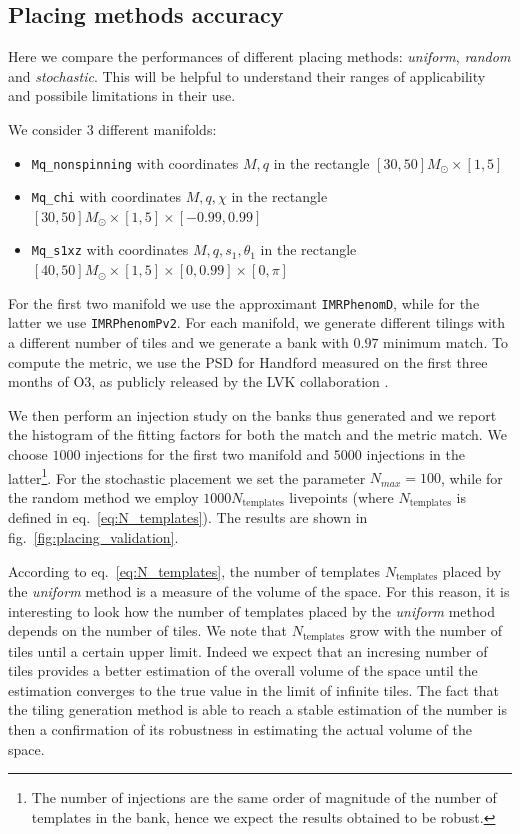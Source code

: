 \documentclass[twocolumn,showpacs,preprintnumbers,nofootinbib,prd,
superscriptaddress,10pt]{revtex4-2}
\begin{document}
\subsection{Placing methods accuracy} \label{sec:placing_accuracy}

Here we compare the performances of different placing methods: \textit{uniform}, \textit{random} and \textit{stochastic}.
This will be helpful to understand their ranges of applicability and possibile limitations in their use.

We consider 3 different manifolds:
\begin{itemize}
	\item \texttt{Mq\_nonspinning} with coordinates $M, q$ in the rectangle $[30, 50] M_\odot \times [1,5]$
	\item \texttt{Mq\_chi} with coordinates $M, q, \chi $ in the rectangle $[30, 50] M_\odot \times [1,5] \times [-0.99, 0.99]$
	\item \texttt{Mq\_s1xz} with coordinates $M, q, s_{1}, \theta_1$ in the rectangle $[40, 50] M_\odot \times [1,5] \times [0, 0.99] \times [0,\pi]$
\end{itemize}
For the first two manifold we use the approximant \texttt{IMRPhenomD}, while for the latter we use \texttt{IMRPhenomPv2}.
For each manifold, we generate different tilings with a different number of tiles and we generate a bank with $0.97$ minimum match.
To compute the metric, we use the PSD for Handford measured on the first three months of O3, as publicly released by the LVK collaboration \cite{https://dcc.ligo.org/LIGO-T2000012/public}.

We then perform an injection study on the banks thus generated and we report the histogram of the fitting factors for both the match and the metric match. We choose $1000$ injections for the first two manifold and $5000$ injections in the latter\footnote{
The number of injections are the same order of magnitude of the number of templates in the bank, hence we expect the results obtained to be robust.}.
For the stochastic placement we set the parameter $N_{max} = 100$, while for the random method we employ $1000 N_{\text{templates}}$ livepoints (where $N_{\text{templates}}$ is defined in eq.~\eqref{eq:N_templates}).
The results are shown in fig.~\ref{fig:placing_validation}.

According to eq.~\eqref{eq:N_templates}, the number of templates $N_{\text{templates}}$ placed by the {\it uniform} method is a measure of the volume of the space. For this reason, it is interesting to look how the number of templates placed by the {\it uniform} method depends on the number of tiles.
We note that $N_{\text{templates}}$ grow with the number of tiles until a certain upper limit. Indeed we expect that an incresing number of tiles provides a better estimation of the overall volume of the space until the estimation converges to the true value in the limit of infinite tiles. 
The fact that the tiling generation method is able to reach a stable estimation of the number is then a confirmation of its robustness in estimating the actual volume of the space.
\end{document}
